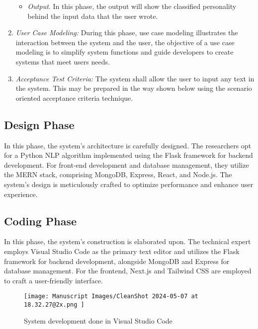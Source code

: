 \documentclass[conference]{IEEEtran}
\begin{document}
\begin{enumerate}
\begin{itemize}
                \item \textit{Output}. In this phase, the output will show the classified
                    personality behind the input data that the user wrote.
            \end{itemize}

        \item \textit{User Case Modeling:} During this phase, use case modeling illustrates the interaction
            between the system and the user, the objective of a use case modeling is to simplify
            system functions and guide developers to create systems that meet users needs.

        \item \textit{Acceptance Test Criteria:} The system shall allow the user to input any text
            in the system. This may be prepared in the way shown below using the scenario oriented acceptance
            criteria technique.
    \end{enumerate}

    \subsection{Design Phase}

    In this phase, the system's architecture is carefully designed. The researchers opt for a Python
    NLP algorithm implemented using the Flask framework for backend development. For front-end
    development and database management, they utilize the MERN stack, comprising MongoDB, Express,
    React, and Node.js. The system's design is meticulously crafted to optimize performance and
    enhance user experience.

    \subsection{Coding Phase}

    In this phase, the system's construction is elaborated upon. The technical expert employs Visual
    Studio Code as the primary text editor and utilizes the Flask framework for backend development,
    alongside MongoDB and Express for database management. For the frontend, Next.js and Tailwind
    CSS are employed to craft a user-friendly interface.

    \begin{figure}[ht]
        \centering
        \texttt{[image: 
            Manuscript Images/CleanShot 2024-05-07 at 18.32.27@2x.png
        ]}
        \caption{System development done in Visual Studio Code}
    \end{figure}
\end{document}
